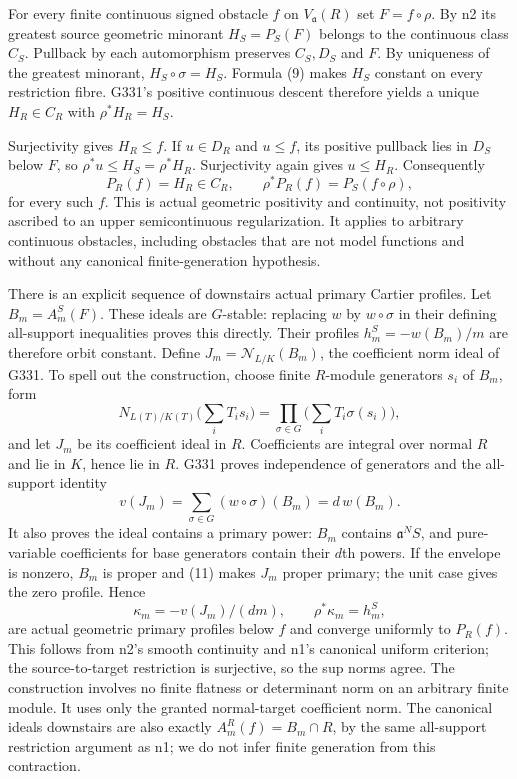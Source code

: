 \documentclass[11pt]{article}
\begin{document}
For every finite continuous signed obstacle $f$ on $V_{\mathfrak a}(R)$ set $F=f\circ\rho$. By n2 its greatest source geometric minorant $H_S=P_S(F)$ belongs to the continuous class $C_S$. Pullback by each automorphism preserves $C_S,D_S$ and $F$. By uniqueness of the greatest minorant, $H_S\circ\sigma=H_S$. Formula (9) makes $H_S$ constant on every restriction fibre. G331's positive continuous descent therefore yields a unique $H_R\in C_R$ with $\rho^*H_R=H_S$.

Surjectivity gives $H_R\le f$. If $u\in D_R$ and $u\le f$, its positive pullback lies in $D_S$ below $F$, so $\rho^*u\le H_S=\rho^*H_R$. Surjectivity again gives $u\le H_R$. Consequently
\[
 P_R(f)=H_R\in C_R,\qquad \rho^*P_R(f)=P_S(f\circ\rho), \tag{10}
\]
for every such $f$. This is actual geometric positivity and continuity, not positivity ascribed to an upper semicontinuous regularization. It applies to arbitrary continuous obstacles, including obstacles that are not model functions and without any canonical finite-generation hypothesis.

There is an explicit sequence of downstairs actual primary Cartier profiles. Let $B_m=A_m^S(F)$. These ideals are $G$-stable: replacing $w$ by $w\circ\sigma$ in their defining all-support inequalities proves this directly. Their profiles $h_m^S=-w(B_m)/m$ are therefore orbit constant. Define $J_m=\mathcal N_{L/K}(B_m)$, the coefficient norm ideal of G331. To spell out the construction, choose finite $R$-module generators $s_i$ of $B_m$, form
\[
 N_{L(T)/K(T)}\Big(\sum_i T_i s_i\Big)
 =\prod_{\sigma\in G}\Big(\sum_i T_i\sigma(s_i)\Big),
\]
and let $J_m$ be its coefficient ideal in $R$. Coefficients are integral over normal $R$ and lie in $K$, hence lie in $R$. G331 proves independence of generators and the all-support identity
\[
 v(J_m)=\sum_{\sigma\in G}(w\circ\sigma)(B_m)=d\,w(B_m). \tag{11}
\]
It also proves the ideal contains a primary power: $B_m$ contains $\mathfrak a^NS$, and pure-variable coefficients for base generators contain their $d$th powers. If the envelope is nonzero, $B_m$ is proper and (11) makes $J_m$ proper primary; the unit case gives the zero profile. Hence
\[
 \kappa_m=-v(J_m)/(dm),\qquad \rho^*\kappa_m=h_m^S,
\]
are actual geometric primary profiles below $f$ and converge uniformly to $P_R(f)$. This follows from n2's smooth continuity and n1's canonical uniform criterion; the source-to-target restriction is surjective, so the sup norms agree. The construction involves no finite flatness or determinant norm on an arbitrary finite module. It uses only the granted normal-target coefficient norm. The canonical ideals downstairs are also exactly $A_m^R(f)=B_m\cap R$, by the same all-support restriction argument as n1; we do not infer finite generation from this contraction.
\end{document}
